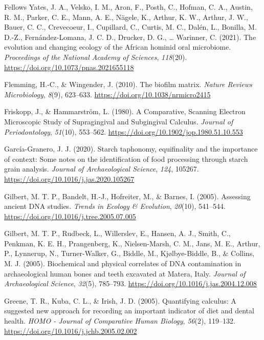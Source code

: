 \documentclass[
  b5paper,
]{book}
\newlength{\cslhangindent}
\newenvironment{CSLReferences}[2] %
 {\begin{list}{}{%
  \setlength{\itemindent}{0pt}
  \setlength{\leftmargin}{0pt}
  \setlength{\parsep}{0pt}
  \ifodd #1
   \setlength{\leftmargin}{\cslhangindent}
   \setlength{\itemindent}{-1\cslhangindent}
  \fi
  \setlength{\itemsep}{#2\baselineskip}}}
 {\end{list}}
\begin{document}
\begin{CSLReferences}{1}{0}
Fellows Yates, J. A., Velsko, I. M., Aron, F., Posth, C., Hofman, C. A.,
Austin, R. M., Parker, C. E., Mann, A. E., Nägele, K., Arthur, K. W.,
Arthur, J. W., Bauer, C. C., Crevecoeur, I., Cupillard, C., Curtis, M.
C., Dalén, L., Bonilla, M. D.-Z., Fernández-Lomana, J. C. D., Drucker,
D. G., \ldots{} Warinner, C. (2021). The evolution and changing ecology
of the {African} hominid oral microbiome. \emph{Proceedings of the
National Academy of Sciences}, \emph{118}(20).
\url{https://doi.org/10.1073/pnas.2021655118}

Flemming, H.-C., \& Wingender, J. (2010). The biofilm matrix.
\emph{Nature Reviews Microbiology}, \emph{8}(9), 623--633.
\url{https://doi.org/10.1038/nrmicro2415}

Friskopp, J., \& Hammarström, L. (1980). A {Comparative}, {Scanning
Electron Microscopic Study} of {Supragingival} and {Subgingival
Calculus}. \emph{Journal of Periodontology}, \emph{51}(10), 553--562.
\url{https://doi.org/10.1902/jop.1980.51.10.553}

García-Granero, J. J. (2020). Starch taphonomy, equifinality and the
importance of context: {Some} notes on the identification of food
processing through starch grain analysis. \emph{Journal of
Archaeological Science}, \emph{124}, 105267.
\url{https://doi.org/10.1016/j.jas.2020.105267}

Gilbert, M. T. P., Bandelt, H.-J., Hofreiter, M., \& Barnes, I. (2005).
Assessing ancient {DNA} studies. \emph{Trends in Ecology \& Evolution},
\emph{20}(10), 541--544.
\url{https://doi.org/10.1016/j.tree.2005.07.005}

Gilbert, M. T. P., Rudbeck, L., Willerslev, E., Hansen, A. J., Smith,
C., Penkman, K. E. H., Prangenberg, K., Nielsen-Marsh, C. M., Jans, M.
E., Arthur, P., Lynnerup, N., Turner-Walker, G., Biddle, M.,
Kjølbye-Biddle, B., \& Collins, M. J. (2005). Biochemical and physical
correlates of {DNA} contamination in archaeological human bones and
teeth excavated at {Matera}, {Italy}. \emph{Journal of Archaeological
Science}, \emph{32}(5), 785--793.
\url{https://doi.org/10.1016/j.jas.2004.12.008}

Greene, T. R., Kuba, C. L., \& Irish, J. D. (2005). Quantifying
calculus: {A} suggested new approach for recording an important
indicator of diet and dental health. \emph{HOMO - Journal of Comparative
Human Biology}, \emph{56}(2), 119--132.
\url{https://doi.org/10.1016/j.jchb.2005.02.002}


\end{CSLReferences}
\end{document}
